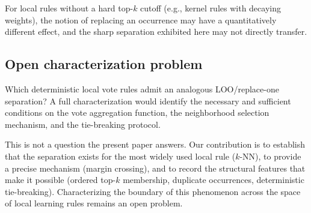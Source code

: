 For local rules without a hard top-$k$ cutoff (e.g., kernel rules with
decaying weights), the notion of replacing an occurrence may have a
quantitatively different effect, and the sharp separation exhibited here may
not directly transfer.

\subsection{Open characterization problem}

Which deterministic local vote rules admit an analogous LOO/replace-one
separation?  A full characterization would identify the necessary and
sufficient conditions on the vote aggregation function, the neighborhood
selection mechanism, and the tie-breaking protocol.

This is not a question the present paper answers.  Our contribution is to
establish that the separation exists for the most widely used local rule
($k$-NN), to provide a precise mechanism (margin crossing), and to record the
structural features that make it possible (ordered top-$k$ membership,
duplicate occurrences, deterministic tie-breaking).  Characterizing the
boundary of this phenomenon across the space of local learning rules remains an
open problem.

